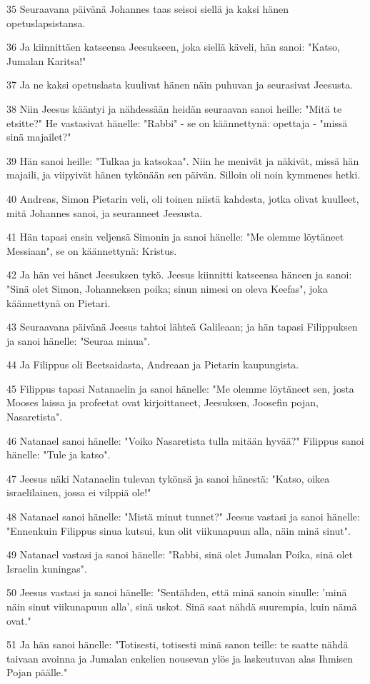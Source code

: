\par 35 Seuraavana päivänä Johannes taas seisoi siellä ja kaksi hänen opetuslapsistansa.
\par 36 Ja kiinnittäen katseensa Jeesukseen, joka siellä käveli, hän sanoi: "Katso, Jumalan Karitsa!"
\par 37 Ja ne kaksi opetuslasta kuulivat hänen näin puhuvan ja seurasivat Jeesusta.
\par 38 Niin Jeesus kääntyi ja nähdessään heidän seuraavan sanoi heille: "Mitä te etsitte?" He vastasivat hänelle: "Rabbi" - se on käännettynä: opettaja - "missä sinä majailet?"
\par 39 Hän sanoi heille: "Tulkaa ja katsokaa". Niin he menivät ja näkivät, missä hän majaili, ja viipyivät hänen tykönään sen päivän. Silloin oli noin kymmenes hetki.
\par 40 Andreas, Simon Pietarin veli, oli toinen niistä kahdesta, jotka olivat kuulleet, mitä Johannes sanoi, ja seuranneet Jeesusta.
\par 41 Hän tapasi ensin veljensä Simonin ja sanoi hänelle: "Me olemme löytäneet Messiaan", se on käännettynä: Kristus.
\par 42 Ja hän vei hänet Jeesuksen tykö. Jeesus kiinnitti katseensa häneen ja sanoi: "Sinä olet Simon, Johanneksen poika; sinun nimesi on oleva Keefas", joka käännettynä on Pietari.
\par 43 Seuraavana päivänä Jeesus tahtoi lähteä Galileaan; ja hän tapasi Filippuksen ja sanoi hänelle: "Seuraa minua".
\par 44 Ja Filippus oli Beetsaidasta, Andreaan ja Pietarin kaupungista.
\par 45 Filippus tapasi Natanaelin ja sanoi hänelle: "Me olemme löytäneet sen, josta Mooses laissa ja profeetat ovat kirjoittaneet, Jeesuksen, Joosefin pojan, Nasaretista".
\par 46 Natanael sanoi hänelle: "Voiko Nasaretista tulla mitään hyvää?" Filippus sanoi hänelle: "Tule ja katso".
\par 47 Jeesus näki Natanaelin tulevan tykönsä ja sanoi hänestä: "Katso, oikea israelilainen, jossa ei vilppiä ole!"
\par 48 Natanael sanoi hänelle: "Mistä minut tunnet?" Jeesus vastasi ja sanoi hänelle: "Ennenkuin Filippus sinua kutsui, kun olit viikunapuun alla, näin minä sinut".
\par 49 Natanael vastasi ja sanoi hänelle: "Rabbi, sinä olet Jumalan Poika, sinä olet Israelin kuningas".
\par 50 Jeesus vastasi ja sanoi hänelle: "Sentähden, että minä sanoin sinulle: 'minä näin sinut viikunapuun alla', sinä uskot. Sinä saat nähdä suurempia, kuin nämä ovat."
\par 51 Ja hän sanoi hänelle: "Totisesti, totisesti minä sanon teille: te saatte nähdä taivaan avoinna ja Jumalan enkelien nousevan ylös ja laskeutuvan alas Ihmisen Pojan päälle."

